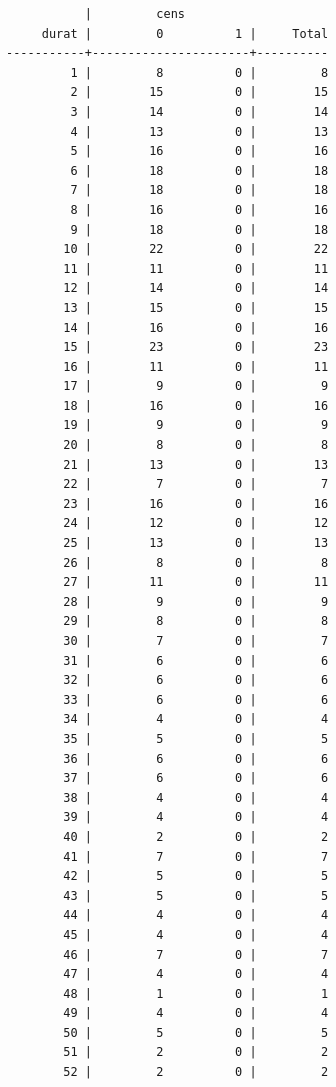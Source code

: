 \documentclass[
]{book}
\begin{document}
\begin{verbatim}
           |         cens
     durat |         0          1 |     Total
-----------+----------------------+----------
         1 |         8          0 |         8 
         2 |        15          0 |        15 
         3 |        14          0 |        14 
         4 |        13          0 |        13 
         5 |        16          0 |        16 
         6 |        18          0 |        18 
         7 |        18          0 |        18 
         8 |        16          0 |        16 
         9 |        18          0 |        18 
        10 |        22          0 |        22 
        11 |        11          0 |        11 
        12 |        14          0 |        14 
        13 |        15          0 |        15 
        14 |        16          0 |        16 
        15 |        23          0 |        23 
        16 |        11          0 |        11 
        17 |         9          0 |         9 
        18 |        16          0 |        16 
        19 |         9          0 |         9 
        20 |         8          0 |         8 
        21 |        13          0 |        13 
        22 |         7          0 |         7 
        23 |        16          0 |        16 
        24 |        12          0 |        12 
        25 |        13          0 |        13 
        26 |         8          0 |         8 
        27 |        11          0 |        11 
        28 |         9          0 |         9 
        29 |         8          0 |         8 
        30 |         7          0 |         7 
        31 |         6          0 |         6 
        32 |         6          0 |         6 
        33 |         6          0 |         6 
        34 |         4          0 |         4 
        35 |         5          0 |         5 
        36 |         6          0 |         6 
        37 |         6          0 |         6 
        38 |         4          0 |         4 
        39 |         4          0 |         4 
        40 |         2          0 |         2 
        41 |         7          0 |         7 
        42 |         5          0 |         5 
        43 |         5          0 |         5 
        44 |         4          0 |         4 
        45 |         4          0 |         4 
        46 |         7          0 |         7 
        47 |         4          0 |         4 
        48 |         1          0 |         1 
        49 |         4          0 |         4 
        50 |         5          0 |         5 
        51 |         2          0 |         2 
        52 |         2          0 |         2 

\end{verbatim}
\end{document}
